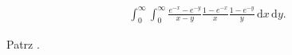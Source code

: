%

\begin{problem_with_solution}
    \label{valean_1_37}%
    \begin{align}
        \int_0^\infty \int_0^\infty \frac {e^{-x}-e^{-y}}{x-y} \frac{1-e^{-x}}{x} \frac{1-e^{-y}}{y} \,\mathrm{d}x \,\mathrm{d}y.
    \end{align} 
\end{problem_with_solution}

\begin{solution}
    Patrz \cite[s. ?????]{valean19}.
\end{solution}

%